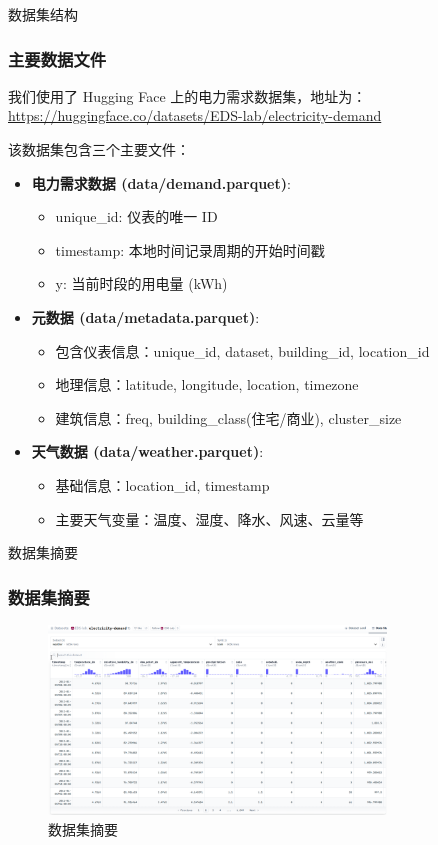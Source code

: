 \documentclass{beamer} %
\begin{document}
\begin{frame}{数据集结构}
    \frametitle{主要数据文件}
    我们使用了 Hugging Face 上的电力需求数据集，地址为：
    \href{https://huggingface.co/datasets/EDS-lab/electricity-demand}{https://huggingface.co/datasets/EDS-lab/electricity-demand}

    该数据集包含三个主要文件：
    \begin{itemize}
        \item \textbf{电力需求数据 (data/demand.parquet)}:
        \begin{itemize}
            \item unique\_id: 仪表的唯一 ID
            \item timestamp: 本地时间记录周期的开始时间戳
            \item y: 当前时段的用电量 (kWh)
        \end{itemize}
        \item \textbf{元数据 (data/metadata.parquet)}:
        \begin{itemize}
            \item 包含仪表信息：unique\_id, dataset, building\_id, location\_id
            \item 地理信息：latitude, longitude, location, timezone
            \item 建筑信息：freq, building\_class(住宅/商业), cluster\_size
        \end{itemize}
        \item \textbf{天气数据 (data/weather.parquet)}:
        \begin{itemize}
            \item 基础信息：location\_id, timestamp
            \item 主要天气变量：温度、湿度、降水、风速、云量等
        \end{itemize}
    \end{itemize}
\end{frame}

\begin{frame}{数据集摘要}
    \frametitle{数据集摘要}

    \begin{figure}[H]
        \centering
        \includegraphics[width=0.8\textwidth]{./image.png}
        \caption{数据集摘要}
    \end{figure}
\end{frame}
\end{document}
